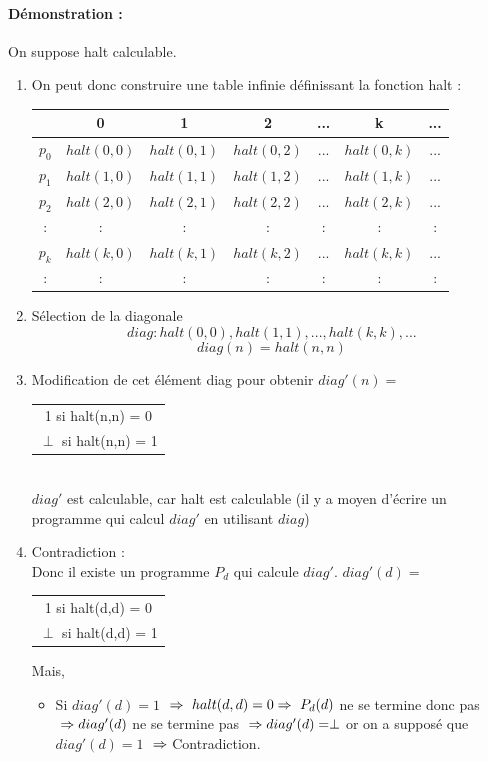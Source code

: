 \paragraph{Démonstration :}
On suppose halt calculable. 
\begin{enumerate}
	\item On peut donc construire une table infinie définissant la fonction
		halt : \\
		\begin{tabular}{|c||c|c|c|c|c|c|}
			\hline
			& 0 & 1 & 2 & ... & k & ... \\
			\hline
			$p_0$ & $halt(0,0)$ & $halt(0,1)$ & $halt(0,2)$ & ... & $halt(0,k)$ & ... \\
			$p_1$ & $halt(1,0)$ & $halt(1,1)$ & $halt(1,2)$ & ... & $halt(1,k)$ & ... \\
			$p_2$ & $halt(2,0)$ & $halt(2,1)$ & $halt(2,2)$ & ... & $halt(2,k)$ & ... \\
			: & : &:& : & : & : &:\\
			$p_k$ & $halt(k,0)$ & $halt(k,1)$ & $halt(k,2)$ & ... & $halt(k,k)$ & ... \\
			: & : &:& : & : & : &:\\
			\hline
		\end{tabular}
	\item Sélection de la diagonale 
		\[ diag :halt(0,0),halt(1,1),...,halt(k,k),... \]	
		\[diag(n) = halt(n,n)\]
	\item Modification de cet élément diag pour obtenir
		$diag'(n) =$ 
		\begin{tabular}{c}
			1 si halt(n,n) = 0\\
			$\perp$ si halt(n,n) = 1\\
		\end{tabular}\\
		$diag'$ est calculable, car halt est calculable (il y a moyen
		d'écrire un programme qui calcul $diag'$ en utilisant $diag$)
	\item Contradiction :\\
	       	Donc il existe un programme $P_d$ qui calcule
		$diag'$.
		$diag'(d) =$ 
		\begin{tabular}{c}
			1 si halt(d,d) = 0\\
			$\perp$ si halt(d,d) = 1\\
		\end{tabular}
		Mais, 
		\begin{itemize}
			\item Si $diag'(d)= 1$ $\\
			\Rightarrow \  halt(d,d) = 0 \\
			\Rightarrow \ P_d(d)$ ne se termine donc pas $ \\
			\Rightarrow diag'(d)$ ne se termine pas $ \\
			\Rightarrow diag'(d) = \perp$ or on a supposé que $diag'(d) = 1$ $ \\
			\Rightarrow $
			Contradiction.


\end{itemize}
\end{enumerate}
